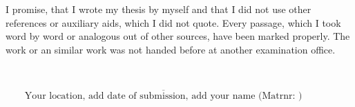 
I promise, that I wrote my thesis by myself and that I did not use other references or auxiliary aids, which I did not quote. Every passage, which I took word by word or analogous out of other sources, have been marked properly. The work or an similar work was not handed before at another examination office.

~~~\\

\vspace{5cm}

$\overline{~~~~~~~~~\mbox{Your location, add date of submission, add your name (Matrnr: )}~~~~~~~~~}$


